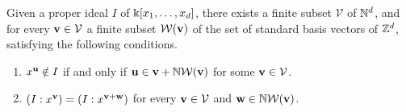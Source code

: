 \documentclass[11pt]{amsart}
\begin{document}
\begin{lemma}
\label{monomial-noetherian-decomposition: L}
Given a proper ideal $I$ of $\Bbbk[x_1, \ldots, x_d]$, there exists a finite subset $\mathcal{V}$ of $\mathbb{N}^d$, and for every $\mathbf{v} \in \mathcal{V}$ a finite subset $\mathcal{W}(\mathbf{v})$ of the set of standard basis vectors of $\mathbb{Z}^d$,  satisfying the following conditions.
\begin{enumerate}
\item $x^{\mathbf{u}} \notin I$ if and only if $\mathbf{u} \in \mathbf{v} + \mathbb{N} \mathcal{W}(\mathbf{v})$ for some $\mathbf{v} \in \mathcal{V}$.
\item $(I:x^{\mathbf{v}}) = (I: x^{\mathbf{v}+\mathbf{w}})$ for every $\mathbf{v} \in \mathcal{V}$ and $\mathbf{w} \in  \mathbb{N}  \mathcal{W}(\mathbf{v})$.
\end{enumerate}
\end{lemma}
\end{document}
